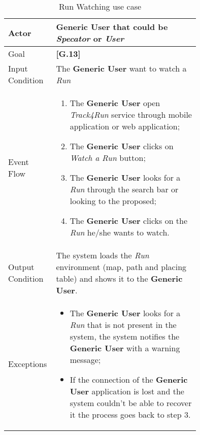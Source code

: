 \begin{center}
\begin{table}
\begin{tabular}{ | l | p{0.75\linewidth} | }
  \hline
    Actor & \textbf{Generic User} that could be \textit{Specator} or \textit{User} \\ \hline
    Goal & \textbf{[G.13]} \\ \hline
    Input Condition & The \textbf{Generic User} want to watch a \textit{Run} \\ \hline
    Event Flow & \begin{minipage}[t]{0.7\textwidth}
      \begin{enumerate}
        \item The \textbf{Generic User} open \textit{Track4Run} service through mobile application or web application;
        \item The \textbf{Generic User} clicks on \textit{Watch a Run} button;
        \item The \textbf{Generic User} looks for a \textit{Run} through the search bar or looking to the proposed;
        \item The \textbf{Generic User} clicks on the \textit{Run} he/she wants to watch.
      \end{enumerate}
    \smallskip
  \end{minipage} \\ \hline
  Output Condition & The system loads the \textit{Run} environment (map, path and placing table) and  shows it to the \textbf{Generic User}. \\ \hline
  Exceptions & \begin{minipage}[t]{0.7\textwidth}
    \begin{itemize}
      \smallskip
      \item The \textbf{Generic User} looks for a \textit{Run} that is not present in the system, the system notifies the \textbf{Generic User} with a warning message;
      \item If the connection of the \textbf{Generic User} application is lost and the system couldn't be able to recover it the process goes back to step 3.
    \end{itemize}
    \smallskip
  \end{minipage}  \\ \hline
\end{tabular}
\caption{Run Watching use case}
\label{table:visitRunTable}
\end{table}
\end{center}
